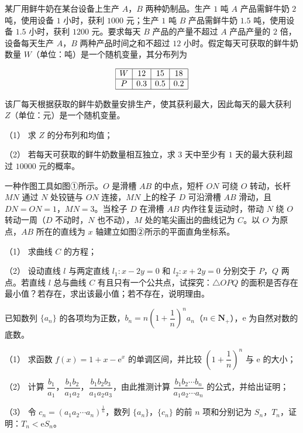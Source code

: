 \begin{question}
某厂用鲜牛奶在某台设备上生产 \(A\)，\(B\) 两种奶制品。生产 \(1\) 吨 \(A\) 产品需鲜牛奶 \(2\) 吨，使用设备 \(1\) 小时，获利 \(1000\) 元；生产 \(1\) 吨 \(B\) 产品需鲜牛奶 \(1.5\) 吨，使用设备 \(1.5\) 小时，获利 \(1200\) 元。要求每天 \(B\) 产品的产量不超过 \(A\) 产品产量的 \(2\) 倍，设备每天生产 \(A\)，\(B\) 两种产品时间之和不超过 \(12\) 小时。假定每天可获取的鲜牛奶数量 \(W\)（单位：吨）是一个随机变量，其分布列为

\nopagebreak[4]
\[
\begin{array}{|c|c|c|c|}
\hline
W & 12 & 15 & 18\\
\hline
P & 0.3 & 0.5 & 0.2\\
\hline
\end{array}
\]

该厂每天根据获取的鲜牛奶数量安排生产，使其获利最大，因此每天的最大获利 \(Z\)（单位：元）是一个随机变量。

（1） 求 \(Z\) 的分布列和均值；

（2） 若每天可获取的鲜牛奶数量相互独立，求 \(3\) 天中至少有 \(1\) 天的最大获利超过 \(10000\) 元的概率。

\Needspace{0.4\textheight}
\end{question}
\begin{question}
一种作图工具如图①所示。\(O\) 是滑槽 \(AB\) 的中点，短杆 \(ON\) 可绕 \(O\) 转动，长杆 \(MN\) 通过 \(N\) 处铰链与 \(ON\) 连接，\(MN\) 上的栓子 \(D\) 可沿滑槽 \(AB\) 滑动，且 \(DN=ON=1\)，\(MN=3\)。当栓子 \(D\) 在滑槽 \(AB\) 内作往复运动时，带动 \(N\) 绕 \(O\) 转动一周（\(D\) 不动时，\(N\) 也不动），\(M\) 处的笔尖画出的曲线记为 \(C\)。以 \(O\) 为原点，\(AB\) 所在的直线为 \(x\) 轴建立如图②所示的平面直角坐标系。

（1） 求曲线 \(C\) 的方程；

（2） 设动直线 \(l\) 与两定直线 \(l_1:x-2y=0\) 和 \(l_2:x+2y=0\) 分别交于 \(P\)，\(Q\) 两点。若直线 \(l\) 总与曲线 \(C\) 有且只有一个公共点，试探究：\(\triangle OPQ\) 的面积是否存在最小值？若存在，求出该最小值；若不存在，说明理由。
\nopagebreak[4]
\begin{center}\end{center}
\nopagebreak[4]
\end{question}
\begin{question}
已知数列 \(\{a_n\}\) 的各项均为正数，\(b_n=n\left(1+\dfrac{1}{n}\right)^n a_n\)（\(n\in\mathbf{N}_+\)），\(\mathrm{e}\) 为自然对数的底数。

（1） 求函数 \(f(x)=1+x-\mathrm{e}^x\) 的单调区间，并比较 \(\left(1+\dfrac{1}{n}\right)^n\) 与 \(\mathrm{e}\) 的大小；

（2） 计算 \(\dfrac{b_1}{a_1}\)，\(\dfrac{b_1b_2}{a_1a_2}\)，\(\dfrac{b_1b_2b_3}{a_1a_2a_3}\)，由此推测计算 \(\dfrac{b_1b_2\cdots b_n}{a_1a_2\cdots a_n}\) 的公式，并给出证明；

（3） 令 \(c_n=(a_1a_2\cdots a_n)^{\frac{1}{n}}\)，数列 \(\{a_n\}\)，\(\{c_n\}\) 的前 \(n\) 项和分别记为 \(S_n\)，\(T_n\)，证明：\(T_n<\mathrm{e}S_n\)。

\end{question}